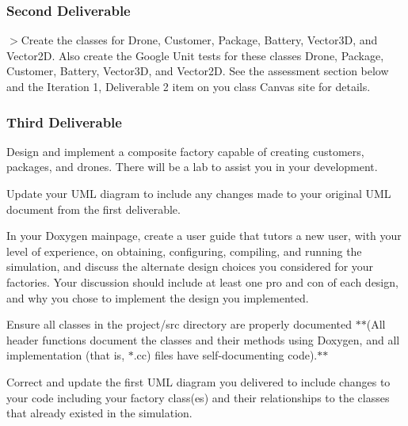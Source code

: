 \subsubsection*{Second Deliverable}

$>$Create the classes for \textquotesingle{}Drone\textquotesingle{}, \textquotesingle{}Customer\textquotesingle{}, \textquotesingle{}Package\textquotesingle{}, \textquotesingle{}Battery\textquotesingle{}, \textquotesingle{}Vector3D\textquotesingle{}, and \textquotesingle{}Vector2D\textquotesingle{}. Also create the Google Unit tests for these classes \textquotesingle{}Drone\textquotesingle{}, \textquotesingle{}Package\textquotesingle{}, \textquotesingle{}Customer\textquotesingle{}, \textquotesingle{}Battery\textquotesingle{}, Vector3D, and \textquotesingle{}Vector2D\textquotesingle{}. See the assessment section below and the Iteration 1, Deliverable 2 item on you class Canvas site for details.

\subsubsection*{Third Deliverable}


\begin{DoxyEnumerate}
\item Design and implement a composite factory capable of creating customers, packages, and drones. There will be a lab to assist you in your development.
\item Update your U\+ML diagram to include any changes made to your original U\+ML document from the first deliverable.
\item In your Doxygen mainpage, create a user guide that tutors a new user, with your level of experience, on obtaining, configuring, compiling, and running the simulation, and discuss the alternate design choices you considered for your factories. Your discussion should include at least one pro and con of each design, and why you chose to implement the design you implemented.
\item Ensure all classes in the {\ttfamily project/src} directory are properly documented $\ast$$\ast$(All header functions document the classes and their methods using Doxygen, and all implementation (that is, $\ast$.cc) files have self-\/documenting code).$\ast$$\ast$
\item Correct and update the first U\+ML diagram you delivered to include changes to your code including your factory class(es) and their relationships to the classes that already existed in the simulation.
\end{DoxyEnumerate}

